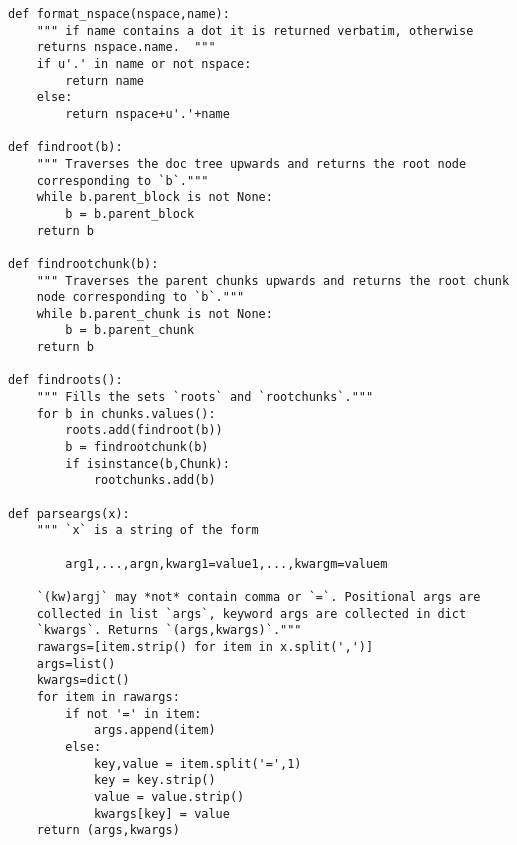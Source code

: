 \documentclass[neutral,proc,reqno]{ml-gen}
\begin{document}
\begin{lstlisting}
def format_nspace(nspace,name):
    """ if name contains a dot it is returned verbatim, otherwise
    returns nspace.name.  """
    if u'.' in name or not nspace: 
        return name
    else:
        return nspace+u'.'+name

def findroot(b):
    """ Traverses the doc tree upwards and returns the root node
    corresponding to `b`."""
    while b.parent_block is not None:
        b = b.parent_block
    return b

def findrootchunk(b):
    """ Traverses the parent chunks upwards and returns the root chunk
    node corresponding to `b`."""
    while b.parent_chunk is not None:
        b = b.parent_chunk
    return b    

def findroots():
    """ Fills the sets `roots` and `rootchunks`."""
    for b in chunks.values():
        roots.add(findroot(b))
        b = findrootchunk(b)
        if isinstance(b,Chunk):
            rootchunks.add(b)

def parseargs(x):
    """ `x` is a string of the form

        arg1,...,argn,kwarg1=value1,...,kwargm=valuem

    `(kw)argj` may *not* contain comma or `=`. Positional args are
    collected in list `args`, keyword args are collected in dict
    `kwargs`. Returns `(args,kwargs)`."""
    rawargs=[item.strip() for item in x.split(',')]
    args=list()
    kwargs=dict()
    for item in rawargs:
        if not '=' in item:
            args.append(item)
        else:
            key,value = item.split('=',1)
            key = key.strip()
            value = value.strip()
            kwargs[key] = value
    return (args,kwargs)        
\end{lstlisting}






\end{document}
